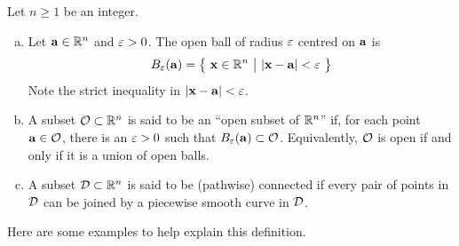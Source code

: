 \begin{defn}\label{def:COopen}
Let $n\ge 1$ be an integer.
\begin{enumerate}[(a)]
\item 
Let $\mathbf{a}\in\mathbb{R}^n$ and $\varepsilon>0$. The open ball of radius $\varepsilon$
centred on $\mathbf{a}$ is
\begin{equation*}
B_\veps(\va)=\big\{\ \vx\in\bbbr^n\ \big|\ |\vx-\va|<\veps\ \big\}
\end{equation*}
Note the strict inequality in $|\mathbf{x}-\mathbf{a}|<\varepsilon$. 

\item
A subset $\mathcal{O}\subset\mathbb{R}^n$ is said to be an ``open subset
of $\mathbb{R}^n$'' if, for each
point $\mathbf{a}\in\mathcal{O}$, there is an $\varepsilon>0$ such that $B_\varepsilon(\mathbf{a})\subset\mathcal{O}$.
Equivalently, $\mathcal{O}$ is open if and only if it is a union of open balls.

\item A subset $\mathcal{D}\subset\mathbb{R}^n$ is said to be (pathwise) 
connected if every pair of points in $\mathcal{D}$ can be joined by a piecewise
smooth curve in $\mathcal{D}$.
\end{enumerate}
\end{defn}
\noindent Here are some examples to help explain this definition.
